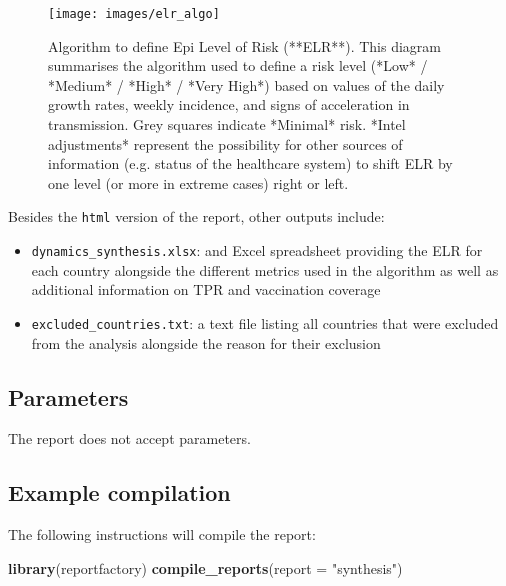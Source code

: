 \documentclass[]{book}
\newenvironment{Shaded}{\begin{snugshade}}{\end{snugshade}}
\newcommand{\DataTypeTok}[1]{\textcolor[rgb]{0.13,0.29,0.53}{#1}}
\newcommand{\KeywordTok}[1]{\textcolor[rgb]{0.13,0.29,0.53}{\textbf{#1}}}
\newcommand{\NormalTok}[1]{#1}
\newcommand{\StringTok}[1]{\textcolor[rgb]{0.31,0.60,0.02}{#1}}
\begin{document}
\begin{figure}

{\centering \texttt{[image: images/elr\_algo]} 

}

\caption{Algorithm to define Epi Level of Risk (**ELR**). This diagram summarises the algorithm used to define a risk level (*Low* / *Medium* / *High* / *Very High*) based on values of the daily growth rates, weekly incidence, and signs of acceleration in transmission. Grey squares indicate *Minimal* risk. *Intel adjustments* represent the possibility for other sources of information (e.g. status of the healthcare system) to shift ELR by one level (or more in extreme cases) right or left.}\label{fig:elr-algo}
\end{figure}

Besides the \texttt{html} version of the report, other outputs include:

\begin{itemize}
\item
  \texttt{dynamics\_synthesis.xlsx}: and Excel spreadsheet providing the ELR for each
  country alongside the different metrics used in the algorithm as well as
  additional information on TPR and vaccination coverage
\item
  \texttt{excluded\_countries.txt}: a text file listing all countries that were
  excluded from the analysis alongside the reason for their exclusion
\end{itemize}

\hypertarget{parameters-2}{%
\subsection{Parameters}\label{parameters-2}}

The report does not accept parameters.

\hypertarget{example-compilation-2}{%
\subsection{Example compilation}\label{example-compilation-2}}

The following instructions will compile the report:

\begin{Shaded}
\begin{Highlighting}[]
\KeywordTok{library}\NormalTok{(reportfactory)}
\KeywordTok{compile_reports}\NormalTok{(}\DataTypeTok{report =} \StringTok{"synthesis"}\NormalTok{)}
\end{Highlighting}
\end{Shaded}
\end{document}
